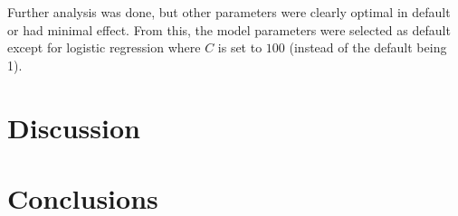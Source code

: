 \documentclass[a4paper]{article}
\begin{document}
Further analysis was done, but other parameters
were clearly optimal in default or had minimal effect.
From this, the model parameters were selected as default
except for logistic regression where $C$ is set to $100$
(instead of the default being 1).

\section{Discussion}
\section{Conclusions}
\end{document}

